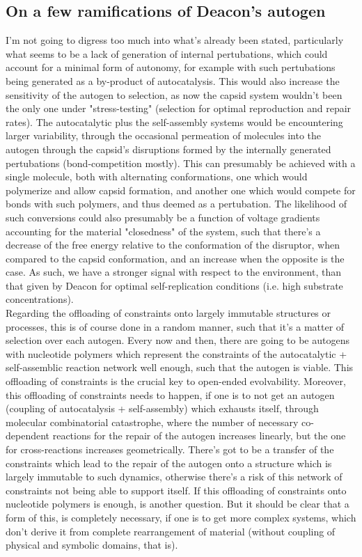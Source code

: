 \documentclass[a4paper,12pt,twoside,leqno]{article}
\begin{document}
\subsection*{On a few ramifications of Deacon's autogen}
I'm not going to digress too much into what's already been stated, particularly what seems to be a lack of generation of internal pertubations, which could account for a minimal form of autonomy, for example with such pertubations being generated as a by-product of autocatalysis. This would also increase the sensitivity of the autogen to selection, as now the capsid system wouldn't been the only one under "stress-testing" (selection for optimal reproduction and repair rates). The autocatalytic plus the self-assembly systems would be encountering larger variability, through the occasional permeation of molecules into the autogen through the capsid's disruptions formed by the internally generated pertubations (bond-competition mostly). This can presumably be achieved with a single molecule, both with alternating conformations, one which would polymerize and allow capsid formation, and another one which would compete for bonds with such polymers, and thus deemed as a pertubation. The likelihood of such conversions could also presumably be a function of voltage gradients accounting for the material "closedness" of the system, such that there's a decrease of the free energy relative to the conformation of the disruptor, when compared to the capsid conformation, and an increase when the opposite is the case. As such, we have a stronger signal with respect to the environment, than that given by Deacon for optimal self-replication conditions (i.e. high substrate concentrations).\\
Regarding the offloading of constraints onto largely immutable structures or processes, this is of course done in a random manner, such that it's a matter of selection over each autogen. Every now and then, there are going to be autogens with nucleotide polymers which represent the constraints of the autocatalytic + self-assemblic reaction network well enough, such that the autogen is viable. This offloading of constraints is the crucial key to open-ended evolvability. Moreover, this offloading of constraints needs to happen, if one is to not get an autogen (coupling of autocatalysis + self-assembly) which exhausts itself, through molecular combinatorial catastrophe, where the number of necessary co-dependent reactions for the repair of the autogen increases linearly, but the one for cross-reactions increases geometrically. There's got to be a transfer of the constraints which lead to the repair of the autogen onto a structure which is largely immutable to such dynamics, otherwise there's a risk of this network of constraints not being able to support itself. If this offloading of constraints onto nucleotide polymers is enough, is another question. But it should be clear that a form of this, is completely necessary, if one is to get more complex systems, which don't derive it from complete rearrangement of material (without coupling of physical and symbolic domains, that is). \\
\end{document}
